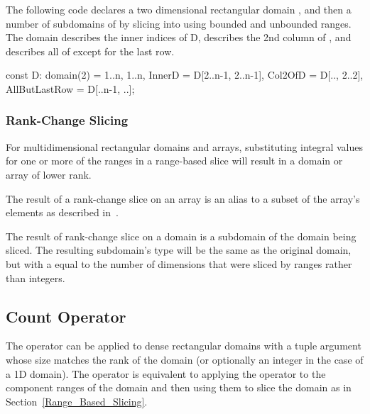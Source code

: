 \begin{example}
The following code declares a two dimensional rectangular
domain , and then a number of subdomains of  by
slicing into  using bounded and unbounded ranges.
The  domain describes the inner indices of
D,  describes the 2nd column of
, and  describes all of  except
for the last row.

\begin{chapel}
const D: domain(2) = {1..n, 1..n},
      InnerD = D[2..n-1, 2..n-1],
      Col2OfD = D[.., 2..2],
      AllButLastRow = D[..n-1, ..];
\end{chapel}
\end{example}

\subsubsection{Rank-Change Slicing}
\label{Rank_Change_Slicing}

For multidimensional rectangular domains and arrays, substituting
integral values for one or more of the ranges in a range-based slice
will result in a domain or array of lower rank.

The result of a rank-change slice on an array is an alias to a subset
of the array's elements as described
in~.

The result of rank-change slice on a domain is a subdomain of the
domain being sliced.  The resulting
subdomain's type will be the same as the original domain, but with
a  equal to the number of dimensions that were sliced by
ranges rather than integers.


\subsection{Count Operator}
\label{Count_Operator_Domains}
The \chpl{#} operator can be applied to dense rectangular domains with
a tuple argument whose size matches the rank of the domain (or
optionally an integer in the case of a 1D domain).  The operator is
equivalent to applying the \chpl{#} operator to the component ranges
of the domain and then using them to slice the domain as in
Section~\ref{Range_Based_Slicing}.


